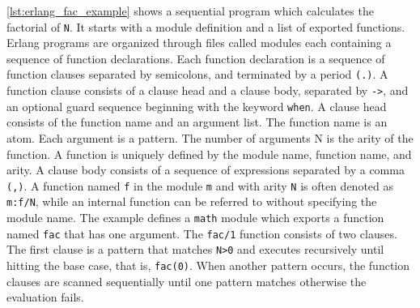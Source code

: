 \autoref{lst:erlang_fac_example} shows a sequential program which calculates the factorial of \verb|N|. It starts with a module definition and a list of exported functions. Erlang programs are organized through files called modules each containing a sequence of function declarations. Each function declaration is a sequence of function clauses separated by semicolons, and terminated by a period \verb|(.)|. A function clause consists of a clause head and a clause body, separated by \verb|->|, and an optional guard sequence beginning with the keyword \verb|when|. A clause head consists of the function name and an argument list. The function name is an atom. Each argument is a pattern. The number of arguments N is the arity of the function. A function is uniquely defined by the module name, function name, and arity. A clause body consists of a sequence of expressions separated by a comma \verb|(,)|. A function named \verb|f| in the module \verb|m| and with arity \verb|N| is often denoted as \verb|m:f/N|, while an internal function can be referred to without specifying the module name. The example defines a \verb|math| module which exports a function named \verb|fac| that has one argument. The \verb|fac/1| function consists of two clauses. The first clause is a pattern that matches \verb|N>0| and executes recursively until hitting the base case, that is, \verb|fac(0)|. When another pattern occurs, the function clauses are scanned sequentially until one pattern matches otherwise the evaluation fails. 


